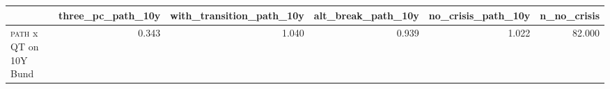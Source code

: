 \begin{tabular}{lrrrrr}
\toprule
 & three\_pc\_path\_10y & with\_transition\_path\_10y & alt\_break\_path\_10y & no\_crisis\_path\_10y & n\_no\_crisis \\
\midrule
\textsc{path} x QT on 10Y Bund & 0.343 & 1.040 & 0.939 & 1.022 & 82.000 \\
\bottomrule
\end{tabular}
